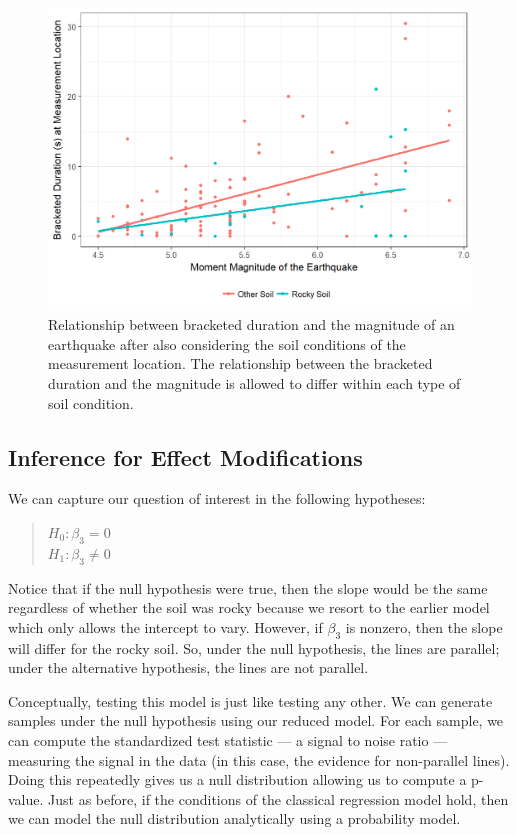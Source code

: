 \documentclass[]{book}
\theoremstyle{plain}
\theoremstyle{mydefn}
\theoremstyle{myexmpl}
\theoremstyle{remark}
\begin{document}
\begin{figure}

{\centering \includegraphics[width=0.8\linewidth]{./Images/regextensions-int-plot-1} 

}

\caption{Relationship between bracketed duration and the magnitude of an earthquake after also considering the soil conditions of the measurement location.  The relationship between the bracketed duration and the magnitude is allowed to differ within each type of soil condition.}\label{fig:regextensions-int-plot}
\end{figure}

\subsection{Inference for Effect
Modifications}\label{inference-for-effect-modifications}

We can capture our question of interest in the following hypotheses:

\begin{quote}
\(H_0: \beta_3 = 0\)\\
\(H_1: \beta_3 \neq 0\)
\end{quote}

Notice that if the null hypothesis were true, then the slope would be
the same regardless of whether the soil was rocky because we resort to
the earlier model which only allows the intercept to vary. However, if
\(\beta_3\) is nonzero, then the slope will differ for the rocky soil.
So, under the null hypothesis, the lines are parallel; under the
alternative hypothesis, the lines are not parallel.

Conceptually, testing this model is just like testing any other. We can
generate samples under the null hypothesis using our reduced model. For
each sample, we can compute the standardized test statistic --- a signal
to noise ratio --- measuring the signal in the data (in this case, the
evidence for non-parallel lines). Doing this repeatedly gives us a null
distribution allowing us to compute a p-value. Just as before, if the
conditions of the classical regression model hold, then we can model the
null distribution analytically using a probability model.
\end{document}

